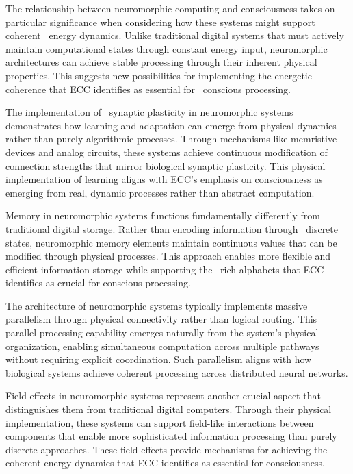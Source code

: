 The relationship between neuromorphic computing and consciousness takes on particular significance when considering how these systems might support coherent~ energy dynamics. Unlike traditional digital systems that must actively maintain computational states through constant energy input, neuromorphic architectures can achieve stable processing through their inherent physical properties. This suggests new possibilities for implementing the energetic coherence that ECC identifies as essential for~ conscious processing.

The implementation of~ synaptic plasticity in neuromorphic systems demonstrates how learning and adaptation can emerge from physical dynamics rather than purely algorithmic processes. Through mechanisms like memristive devices and analog circuits, these systems achieve continuous modification of connection strengths that mirror biological synaptic plasticity. This physical implementation of learning aligns with ECC's emphasis on consciousness as emerging from real, dynamic processes rather than abstract computation.

Memory in neuromorphic systems functions fundamentally differently from traditional digital storage. Rather than encoding information through~ discrete states, neuromorphic memory elements maintain continuous values that can be modified through physical processes. This approach enables more flexible and efficient information storage while supporting the~ rich alphabets that ECC identifies as crucial for conscious processing.

The architecture of neuromorphic systems typically implements massive parallelism through physical connectivity rather than logical routing. This parallel processing capability emerges naturally from the system's physical organization, enabling simultaneous computation across multiple pathways without requiring explicit coordination. Such parallelism aligns with how biological systems achieve coherent processing across distributed neural networks.

 Field effects in neuromorphic systems represent another crucial aspect that distinguishes them from traditional digital computers. Through their physical implementation, these systems can support field-like interactions between components that enable more sophisticated information processing than purely discrete approaches. These field effects provide mechanisms for achieving the coherent energy dynamics that ECC identifies as essential for consciousness.

